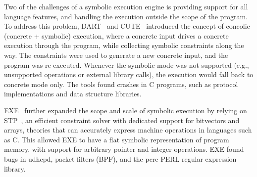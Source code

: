 



Two of the challenges of a symbolic execution engine is providing support for all language features, and handling the execution outside the scope of the program.  To address this problem, DART~\cite{dart} and CUTE~\cite{cute} introduced the concept of concolic (concrete + symbolic) execution, where a concrete input drives a concrete execution through the program, while collecting symbolic constraints along the way.  The constraints were used to generate a new concrete input, and the program was re-executed.  Whenever the symbolic mode was not supported (e.g., unsupported operations or external library calls), the execution would fall back to concrete mode only.  The tools found crashes in C programs, such as protocol implementations and data structure libraries.









EXE~\cite{exe} further expanded the scope and scale of symbolic execution by relying on STP~\cite{stp}, an efficient constraint solver with dedicated support for bitvectors and arrays, theories that can accurately express machine operations in languages such as C.
%
This allowed EXE to have a flat symbolic representation of program memory, with support for arbitrary pointer and integer operations.
%
EXE found bugs in udhcpd, packet filters (BPF), and the pcre PERL regular expression library.

